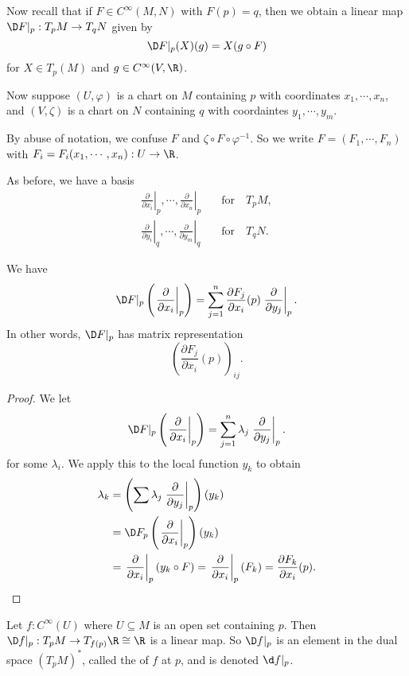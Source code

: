 \documentclass[a4paper]{article}
\begin{document}
Now recall that if $F \in C^\infty (M, N)$ with $F(p) = q$, then we obtain a linear map $\D F|_p: T_pM \to T_q N$ given by
\[
  \D F|_p(X)(g) = X(g \circ F)
\]
for $X \in T_p(M)$ and $g \in C^\infty (V, \R)$.

Now suppose $(U, \varphi)$ is a chart on $M$ containing $p$ with coordinates $x_1, \cdots, x_n$, and $(V, \zeta)$ is a chart on $N$ containing $q$ with coordaintes $y_1,\cdots, y_m$.

By abuse of notation, we confuse $F$ and $\zeta \circ F \circ \varphi^{-1}$. So we write $F = (F_1, \cdots, F_n)$ with $F_i = F_i(x_1, \cdots, x_n): U \to \R$.

As before, we have a basis
\begin{align*}
  \left.\frac{\partial}{\partial x_i}\right|_p, \cdots, \left.\frac{\partial}{\partial x_n}\right|_p&\quad\text{for}\quad T_pM,\\
  \left.\frac{\partial}{\partial y_i}\right|_q, \cdots, \left.\frac{\partial}{\partial y_m}\right|_q&\quad\text{for}\quad T_qN.
\end{align*}

\begin{lemma}
  We have
  \[
    \D F|_p \left(\left.\frac{\partial}{\partial x_i}\right|_p\right) = \sum_{j = 1}^n \frac{\partial F_j}{\partial x_i}(p) \left.\frac{\partial}{\partial y_j}\right|_p.
  \]
  In other words, $\D F|_p$ has matrix representation
  \[
    \left(\frac{\partial F_j}{\partial x_i}(p)\right)_{ij}.
  \]
\end{lemma}

\begin{proof}
  We let
  \[
    \D F|_p \left(\left.\frac{\partial}{\partial x_i}\right|_p\right) = \sum_{j = 1}^n \lambda_j \left.\frac{\partial}{\partial y_j}\right|_p.
  \]
  for some $\lambda_i$. We apply this to the local function $y_k$ to obtain
  \begin{align*}
    \lambda_k &= \left(\sum \lambda_j \left.\frac{\partial}{\partial y_j}\right|_p\right)(y_k)\\
    &= \D F_p \left(\left.\frac{\partial}{\partial x_i}\right|_p\right)(y_k)\\
    &= \left.\frac{\partial}{\partial x_i}\right|_p (y_k \circ F) = \left.\frac{\partial}{\partial x_i}\right|_p(F_k) = \frac{\partial F_k}{\partial x_i}(p).
  \end{align*}
\end{proof}

\begin{eg}
  Let $f: C^\infty(U)$ where $U \subseteq M$ is an open set containing $p$. Then $\D f|_p: T_p M \to T_{f(p)} \R \cong \R$ is a linear map. So $\D f|_p$ is an element in the dual space $(T_pM)^*$, called the  of $f$ at $p$, and is denoted $\d f|_p$.
\end{eg}
\end{document}
